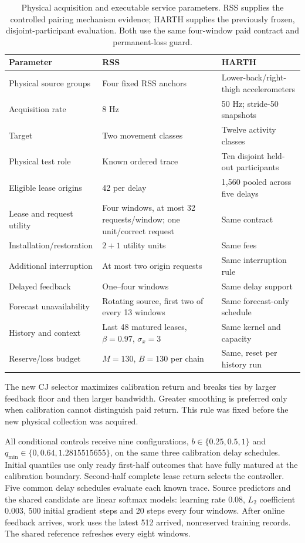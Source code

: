 \documentclass[10pt]{article}
\begin{document}
\begin{table}[t]
\centering\small
\caption{Physical acquisition and executable service parameters. RSS
supplies the controlled pairing mechanism evidence; HARTH supplies the
previously frozen, disjoint-participant evaluation. Both use the same
four-window paid contract and permanent-loss guard.}
\label{tab:physical-service-parameters}
\begin{tabular}{p{.31\linewidth}p{.29\linewidth}p{.29\linewidth}}
\toprule
Parameter & RSS & HARTH\\
\midrule
Physical source groups & Four fixed RSS anchors & Lower-back/right-thigh accelerometers\\
Acquisition rate & 8 Hz & 50 Hz; stride-50 snapshots\\
Target & Two movement classes & Twelve activity classes\\
Physical test role & Known ordered trace & Ten disjoint held-out participants\\
Eligible lease origins & 42 per delay & 1,560 pooled across five delays\\
Lease and request utility & Four windows, at most 32 requests/window; one unit/correct request & Same contract\\
Installation/restoration & $2+1$ utility units & Same fees\\
Additional interruption & At most two origin requests & Same interruption rule\\
Delayed feedback & One--four windows & Same delay support\\
Forecast unavailability & Rotating source, first two of every 13 windows & Same forecast-only schedule\\
History and context & Last 48 matured leases, $\beta=0.97$, $\sigma_x=3$ & Same kernel and capacity\\
Reserve/loss budget & $M=130$, $B=130$ per chain & Same, reset per history run\\
\bottomrule
\end{tabular}
\end{table}

The new CJ selector maximizes calibration return and breaks ties by larger
feedback floor and then larger bandwidth. Greater smoothing is preferred
only when calibration cannot distinguish paid return. This rule was
fixed before the new physical collection was acquired.

All conditional controls receive nine configurations,
$b\in\{0.25,0.5,1\}$ and
$q_{\min}\in\{0,0.64,1.2815515655\}$, on the same three calibration
delay schedules. Initial quantiles use only ready first-half outcomes that
have fully matured at the calibration boundary. Second-half complete
lease return selects the controller. Five common delay schedules evaluate
each known trace. Source predictors and the shared candidate are linear
softmax models: learning rate 0.08, $L_2$ coefficient 0.003, 500 initial
gradient steps and 20 steps every four windows. After online feedback
arrives, work uses the latest 512 arrived, nonreserved training records.
The shared reference refreshes every eight windows.
\end{document}
